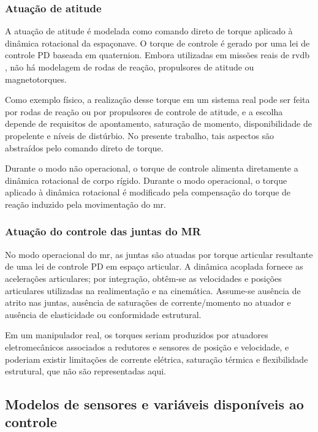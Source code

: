 \subsubsection{Atuação de atitude}
\label{subsubsec_atuacao_atitude}

A atuação de atitude é modelada como comando direto de torque aplicado à dinâmica rotacional da espaçonave.
O torque de controle é gerado por uma lei de controle PD baseada em quaternion.
Embora utilizadas em missões reais de \gls{rvdb} \cite{wertz2011sme_smad}, não há modelagem de rodas de reação, propulsores de atitude ou magnetotorques.

Como exemplo físico, a realização desse torque em um sistema real pode ser feita por rodas de reação ou por propulsores de controle de atitude, e a escolha depende de requisitos de apontamento, saturação de momento, disponibilidade de propelente e níveis de distúrbio. No presente trabalho, tais aspectos são abstraídos pelo comando direto de torque.

Durante o modo não operacional, o torque de controle alimenta diretamente a dinâmica rotacional de corpo rígido.
Durante o modo operacional, o torque aplicado à dinâmica rotacional é modificado pela compensação do torque de reação induzido pela movimentação do \gls{mr}.

\subsubsection{Atuação do controle das juntas do MR}
\label{subsubsec_atuacao_mr}

No modo operacional do \gls{mr}, as juntas são atuadas por torque articular resultante de uma lei de controle PD em espaço articular.
A dinâmica acoplada fornece as acelerações articulares; por integração, obtêm-se as velocidades e posições articulares utilizadas na realimentação e na cinemática.
Assume-se ausência de atrito nas juntas, ausência de saturações de corrente/momento no atuador e ausência de elasticidade ou conformidade estrutural.

Em um manipulador real, os torques seriam produzidos por atuadores eletromecânicos \cite{ieee_canadarm_technical} associados a redutores e sensores de posição e velocidade, e poderiam existir limitações de corrente elétrica, saturação térmica e flexibilidade estrutural, que não são representadas aqui.

\subsection{Modelos de sensores e variáveis disponíveis ao controle}
\label{subsec_modelos_sensoriamento_variaveis}


